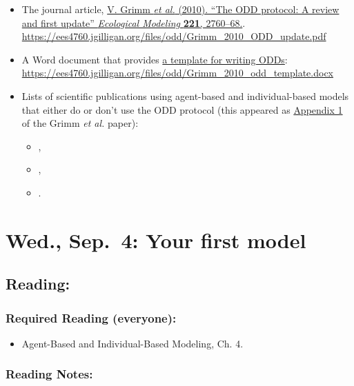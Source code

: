 \documentclass[
]{article}
\providecommand{\tightlist}{%
  \setlength{\itemsep}{0pt}\setlength{\parskip}{0pt}}
\begin{document}
\begin{itemize}
\tightlist
\item
  The journal article, \href{/files/odd/Grimm_2010_ODD_update.pdf}{V.
  Grimm \emph{et al.} (2010). ``The ODD protocol: A review and first
  update'' \emph{Ecological Modeling} \textbf{221}, 2760--68.}.
  \url{https://ees4760.jgilligan.org/files/odd/Grimm_2010_ODD_update.pdf}
\item
  A Word document that provides
  \href{/files/odd/Grimm_2010_odd_template.docx}{a template for writing
  ODDs}:
  \url{https://ees4760.jgilligan.org/files/odd/Grimm_2010_odd_template.docx}
\item
  Lists of scientific publications using agent-based and
  individual-based models that either do or don't use the ODD protocol
  (this appeared as \href{/files/odd/Grimm_2010_appendix_1.pdf}{Appendix
  1} of the Grimm \emph{et al.} paper):

  \begin{itemize}
  \tightlist
  \item
    ,
  \item
    ,
  \item
    .
  \end{itemize}
\end{itemize}

\section{Wed., Sep.~4: Your first
model}\label{wed.-sep.-4-your-first-model}

\subsection{Reading:}\label{reading-4}

\subsubsection{Required Reading
(everyone):}\label{required-reading-everyone-3}

\begin{itemize}
\tightlist
\item
  Agent-Based and Individual-Based Modeling, Ch. 4.
\end{itemize}

\subsubsection{Reading Notes:}\label{reading-notes-3}
\end{document}
